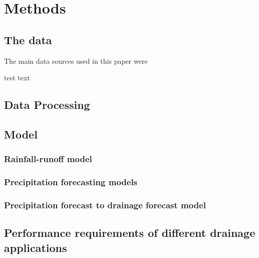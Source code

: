 \chapter{Methods} \label{sec:Methods}

\section{The data}

The main data sources used in this paper were 

test text

\section{Data Processing}
\section{Model}
\subsection{Rainfall-runoff model}
\subsection{Precipitation forecasting models}
\subsection{Precipitation forecast to drainage forecast model}
\section{Performance requirements of different drainage applications}
